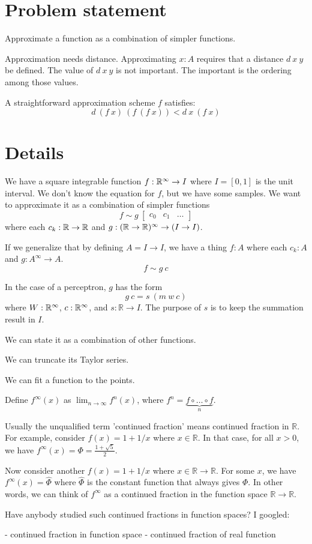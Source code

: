 \section{Problem statement}

Approximate a function as a combination of simpler functions.

Approximation needs distance.
Approximating \(x : A\) requires that a distance \(d~x~y\) be defined.
The value of \(d~x~y\) is not important.
The important is the ordering among those values.

A straightforward approximation scheme \(f\) satisfies:
\[
    d~(f~x)~(f~(f~x)) < d~x~(f~x)
\]

\section{Details}

We have a square integrable function \(f : \mathbb{R}^\infty \to I\)
where \(I = [0,1]\) is the unit interval.
We don't know the equation for \(f\), but we have some samples.
We want to approximate it as a combination of simpler functions
\[
    f \sim g~\begin{bmatrix} c_0 & c_1 & \ldots \end{bmatrix}
\]
where each \(c_k : \mathbb{R} \to \mathbb{R}\)
and \(g : (\mathbb{R} \to \mathbb{R})^\infty \to (I \to I)\).

If we generalize that by defining \(A = I \to I\),
we have a thing \(f : A\)
where each \(c_k : A\) and \(g : A^\infty \to A\).
\[
    f \sim g~c
\]

In the case of a perceptron, \(g\) has the form
\[
    g~c = s ~ (m~w~c)
\]
where \(W : \mathbb{R}^\infty\), \(c : \mathbb{R}^\infty\),
and \(s : \mathbb{R} \to I\).
The purpose of \(s\) is to keep the summation result in \(I\).

We can state it as a combination of other functions.

We can truncate its Taylor series.

We can fit a function to the points.








Define $f^\infty(x)$ as $\lim_{n\to\infty} f^n(x)$, where $f^n = \underbrace{f \circ \ldots \circ f}_{n}$.

Usually the unqualified term 'continued fraction' means continued fraction in $\mathbb{R}$. For example, consider $f(x) = 1+1/x$ where $x \in \mathbb{R}$. In that case, for all $x > 0$, we have $f^\infty(x) = \Phi = \frac{1+\sqrt{5}}{2}$.

Now consider another $f(x) = 1 + 1/x$ where $x \in \mathbb{R} \to \mathbb{R}$. For some $x$, we have $f^\infty(x) = \hat\Phi$ where $\hat\Phi$ is the constant function that always gives $\Phi$. In other words, we can think of $f^\infty$ as a continued fraction in the function space $\mathbb{R} \to \mathbb{R}$.

Have anybody studied such continued fractions in function spaces? I googled:

- continued fraction in function space
- continued fraction of real function

